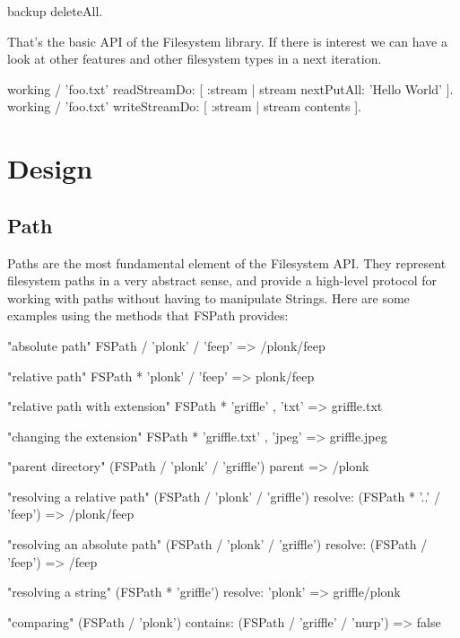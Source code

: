 \documentclass[a4paper,10pt,twoside]{book}
\begin{document}
 backup deleteAll.
 
That's the basic API of the Filesystem library. If there is interest we can have a look at other features and other filesystem types in a next iteration.



 working / 'foo.txt' readStreamDo: [ :stream | stream nextPutAll: 'Hello World' ].
 working / 'foo.txt' writeStreamDo: [ :stream | stream contents ].


\section{Design }

\subsection{Path}

Paths are the most fundamental element of the Filesystem API. They represent filesystem paths in a very abstract sense, and provide a high-level protocol for working with paths without having to manipulate Strings. Here are some examples using the methods that FSPath provides:

\begin{code}{}
    "absolute path"
    FSPath / 'plonk' / 'feep'       => /plonk/feep
    
    "relative path"
    FSPath * 'plonk' / 'feep'       => plonk/feep

    "relative path with extension"
    FSPath * 'griffle' , 'txt'      => griffle.txt
    
    "changing the extension"
    FSPath * 'griffle.txt' , 'jpeg'     => griffle.jpeg
    
    "parent directory"
    (FSPath / 'plonk' / 'griffle') parent   => /plonk
    
    "resolving a relative path"
    (FSPath / 'plonk' / 'griffle') resolve: (FSPath * '..' / 'feep')
                        => /plonk/feep
    
    "resolving an absolute path"
    (FSPath / 'plonk' / 'griffle') resolve: (FSPath / 'feep')
                        => /feep
                        
    "resolving a string"
    (FSPath * 'griffle') resolve: 'plonk'   => griffle/plonk
                        
    "comparing"
    (FSPath / 'plonk') contains: (FSPath / 'griffle' / 'nurp')
                        => false
\end{code}
\end{document}
